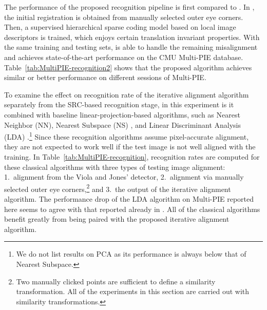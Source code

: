 The performance of the proposed recognition pipeline is first compared to
\cite{Yang2010-CVPR}. In \cite{Yang2010-CVPR}, the initial registration is
obtained from manually selected outer eye corners. Then, a supervised
hierarchical sparse coding model based on local image descriptors is trained,
which enjoys certain translation invariant properties. With the same training
and testing sets, \cite{Yang2010-CVPR} is able to handle the remaining
misalignment and achieves state-of-the-art performance on the CMU Multi-PIE
database.  Table~\ref{tab:MultiPIE-recognition2} shows that the proposed
algorithm achieves similar or better performance on different sessions of
Multi-PIE.

To examine the effect on recognition rate of the iterative alignment algorithm
separately from the SRC-based recognition stage, in this experiment is it
combined with baseline linear-projection-based algorithms, such as Nearest
Neighbor (NN), Nearest Subspace (NS) \cite{Lee2005-PAMI}, and Linear
Discriminant Analysis (LDA) \cite{Belhumeur1997-PAMI}.\footnote{We do not list
results on PCA \cite{Turk1991-CVPR} as its performance is always below that of
Nearest Subspace.} Since these recognition algorithms assume pixel-accurate
alignment, they are not expected to work well if the test image is not well
aligned with the training. In Table~\ref{tab:MultiPIE-recognition}, recognition
rates are computed for these classical algorithms with three types of testing
image alignment: 1.\ alignment from the Viola and Jones' detector, 2.\
alignment via manually selected outer eye corners,\footnote{Two manually
clicked points are sufficient to define a similarity transformation. All of the
experiments in this section are carried out with similarity transformations.}
and 3.\ the output of the iterative alignment algorithm. The performance drop
of the LDA algorithm on Multi-PIE reported here seems to agree with that
reported already in \cite{Gross2008-FGR}.  All of the classical algorithms
benefit greatly from being paired with the proposed iterative alignment
algorithm.

